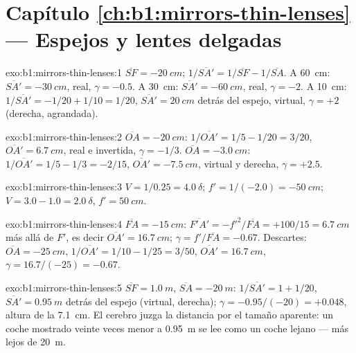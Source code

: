\section*{Capítulo \ref{ch:b1:mirrors-thin-lenses} --- Espejos y lentes delgadas}

\begin{solution}{exo:b1:mirrors-thin-lenses:1}
$\overline{SF} = \qty{-20}{cm}$; $1/\overline{SA'} = 1/\overline{SF} -
1/\overline{SA}$. A \qty{60}{cm}: $\overline{SA'} = \qty{-30}{cm}$,
real, $\gamma = -0.5$. A \qty{30}{cm}: $\overline{SA'} = \qty{-60}{cm}$,
real, $\gamma = -2$. A \qty{10}{cm}: $1/\overline{SA'} = -1/20 + 1/10
= 1/20$, $\overline{SA'} = \qty{+20}{cm}$ detrás del espejo, virtual,
$\gamma = +2$ (derecha, agrandada).
\end{solution}

\begin{solution}{exo:b1:mirrors-thin-lenses:2}
$\overline{OA} = \qty{-20}{cm}$: $1/\overline{OA'} = 1/5 - 1/20 = 3/20$,
$\overline{OA'} = \qty{+6.7}{cm}$, real e invertida, $\gamma = -1/3$.
$\overline{OA} = \qty{-3.0}{cm}$: $1/\overline{OA'} = 1/5 - 1/3 = -2/15$,
$\overline{OA'} = \qty{-7.5}{cm}$, virtual y derecha, $\gamma = +2.5$.
\end{solution}

\begin{solution}{exo:b1:mirrors-thin-lenses:3}
$V = 1/0.25 = \qty{+4.0}{\delta}$; $f' = 1/(-2.0) = \qty{-50}{cm}$;
$V = 3.0 - 1.0 = \qty{+2.0}{\delta}$, $f' = \qty{50}{cm}$.
\end{solution}

\begin{solution}{exo:b1:mirrors-thin-lenses:4}
$\overline{FA} = \qty{-15}{cm}$: $\overline{F'A'} = -f'^2/\overline{FA}
= +100/15 = \qty{6.7}{cm}$ más allá de $F'$, es decir $\overline{OA'} = \qty{16.7}{cm}$;
$\gamma = f'/\overline{FA} = -0.67$. Descartes: $\overline{OA} =
\qty{-25}{cm}$, $1/\overline{OA'} = 1/10 - 1/25 = 3/50$,
$\overline{OA'} = \qty{16.7}{cm}$, $\gamma = 16.7/(-25) = -0.67$.
\end{solution}

\begin{solution}{exo:b1:mirrors-thin-lenses:5}
$\overline{SF} = \qty{+1.0}{m}$, $\overline{SA} = \qty{-20}{m}$:
$1/\overline{SA'} = 1 + 1/20$, $\overline{SA'} = \qty{0.95}{m}$ detrás
del espejo (virtual, derecha); $\gamma = -0.95/(-20) = +0.048$, altura de
la  \qty{7.1}{cm}. El cerebro juzga la distancia por el tamaño
aparente: un coche mostrado veinte veces menor a \qty{0.95}{m} se lee como
un coche lejano --- más lejos de \qty{20}{m}.
\end{solution}

